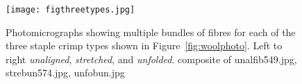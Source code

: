 %

\begin{figure}[!h]
  \centering
  \texttt{[image: figthreetypes.jpg]}
  \caption{Photomicrographs showing multiple bundles of fibres for each of the three staple crimp types shown in Figure~\ref{fig:woolphoto}. Left to right {\em unaligned}, {\em stretched}, and {\em unfolded}.  composite of unalfib549.jpg, strebun574.jpg, unfobun.jpg}
  \label{fig:threetypes}
\end{figure}

%

